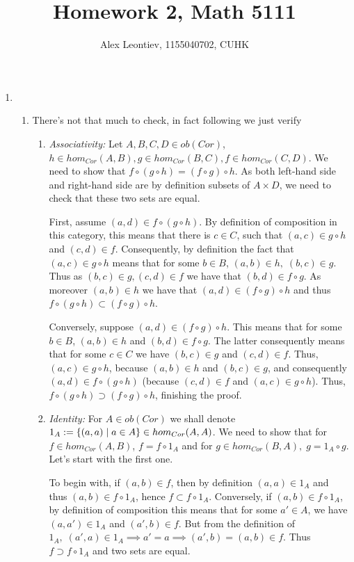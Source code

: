 \documentclass[8pt]{article} %
\title{Homework 2, Math 5111}
\author{Alex Leontiev, 1155040702, CUHK}
\begin{document}
\maketitle
\begin{enumerate}[label=\bfseries Problem \arabic*.]
	\item{\begin{enumerate}[label=(\arabic*).]
			\item{There's not that much to check, in fact following \cite[subsection 10.1.1]{tb} we just verify
				\begin{enumerate}[label=(\roman*)]
					\item{{\it Associativity: } Let $A,B,C,D\in ob(Cor)$, $h\in hom_{Cor}(A,B),g\in
						hom_{Cor}(B,C),f\in hom_{Cor}(C,D)$. We need to show that $f\circ(g\circ h)=(f\circ g)\circ h$.
						As both left-hand side and right-hand side are by definition subsets of $A\times D$, we need to check
						that these two sets are equal.
						
						First, assume $(a,d)\in f\circ(g\circ h)$. By definition of composition in this category, this means
						that there is $c\in C$, such that $(a,c)\in g\circ h$ and $(c,d)\in f$. Consequently, by definition
						the fact that $(a,c)\in g\circ h$ means that for some $b\in B$, $(a,b)\in h,\;(b,c)\in g$. Thus
						as $(b,c)\in g,(c,d)\in f$ we have that $(b,d)\in f\circ g$. As moreover $(a,b)\in h$ we have that
						$(a,d)\in (f\circ g)\circ h$ and thus $f\circ(g\circ h)\subset(f\circ g)\circ h$.
						
						Conversely, suppose $(a,d)\in (f\circ g)\circ h$. This means that for some $b\in B$,
						$(a,b)\in h$ and $(b,d)\in f\circ g$. The latter consequently means that for some
						$c\in C$ we have $(b,c)\in g$ and $(c,d)\in f$. Thus, $(a,c)\in g\circ h$, because
						$(a,b)\in h$ and $(b,c)\in g$, and consequently $(a,d)\in f\circ(g\circ h)$ (because
						$(c,d)\in f$ and $(a,c)\in g\circ h$). Thus, $f\circ(g\circ h)\supset(f\circ g)\circ h$,
						finishing the proof.
						}
					\item{{\it Identity: } For $A\in ob(Cor)$ we shall denote $1_A:=\left\{(a,a)\mid a\in A\right\}\in hom_{Cor}(A,A)$.
						We need to show that for $f\in hom_{Cor}(A,B)$, $f=f\circ 1_A$ and for $g\in hom_{Cor}(B,A),\;
						g=1_A\circ g$. Let's start with the first one.
						
						To begin with, if $(a,b)\in f$, then by definition $(a,a)\in 1_A$ and thus $(a,b)\in f\circ 1_A$,
						hence $f\subset f\circ 1_A$.
						Conversely, if $(a,b)\in f\circ 1_A$, by definition of composition this means that for some $a'
						\in A$, we have $(a,a')\in 1_A$ and $(a',b)\in f$. But from the definition of $1_A,
						\;(a',a)\in 1_A\implies a'=a\implies (a',b)=
						(a,b)\in f$. Thus $f\supset f\circ 1_A$ and two sets are equal.
						
}
\end{enumerate}}
\end{enumerate}}
\end{enumerate}
\end{document}
